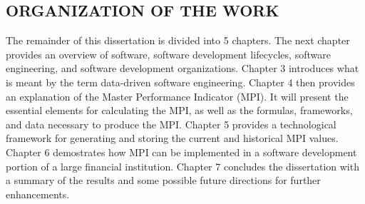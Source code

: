 \documentclass[SDSUThesis.tex]{subfiles}
\begin{document}
\subsection{ORGANIZATION OF THE WORK}

The remainder of this dissertation is divided into 5 chapters.  The next chapter provides
an overview of software, software development lifecycles, software engineering, and software
development organizations.  Chapter 3 introduces what is meant by the term data-driven
software engineering. Chapter 4 then provides an explanation of the Master Performance 
Indicator (MPI).  It will present the essential elements for calculating the MPI, as well
as the formulas, frameworks, and data necessary to produce the MPI. Chapter 5 provides
a technological framework for generating and storing the current and historical MPI values.
Chapter 6 demostrates how MPI can be implemented in a software development portion of 
a large financial institution.  Chapter 7 concludes the dissertation with a summary
of the results and some possible future directions for further enhancements. 
\end{document}
